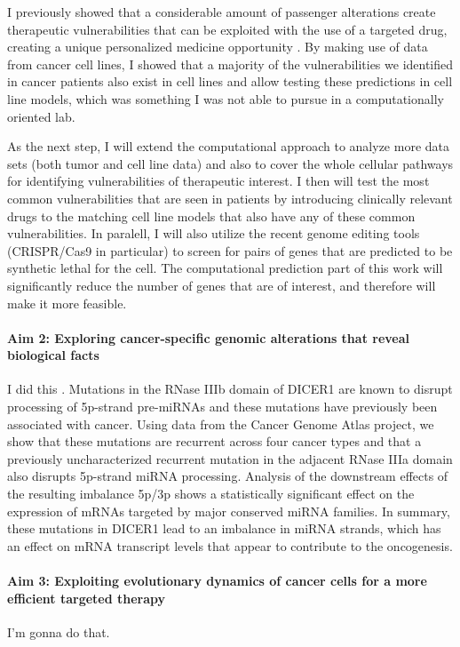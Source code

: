 \documentclass[11pt,letterpaper]{article}
\begin{document}
I previously showed that a considerable amount of passenger alterations create therapeutic vulnerabilities that can be exploited with the use of a targeted drug, creating a unique personalized medicine opportunity \cite{aksoy2014prediction}.
By making use of data from cancer cell lines,
I showed that a majority of the vulnerabilities we identified in cancer patients also exist in cell lines
and allow testing these predictions in cell line models, which was something I was not able to pursue in a computationally oriented lab.

As the next step, I will extend the computational approach to analyze more data sets (both tumor and cell line data) and also to cover the whole cellular pathways for identifying vulnerabilities of therapeutic interest.
I then will test the most common vulnerabilities that are seen in patients by introducing clinically relevant drugs to the matching cell line models that also have any of these common vulnerabilities.
In paralell, I will also utilize the recent genome editing tools (CRISPR/Cas9 in particular)
to screen for pairs of genes that are predicted to be synthetic lethal for the cell.
The computational prediction part of this work will significantly reduce the number of genes that are of interest,
and therefore will make it more feasible.


\paragraph{Aim 2: Exploring cancer-specific genomic alterations that reveal biological facts}
I did this \cite{aksoy2014cancer}.
Mutations in the RNase IIIb domain of DICER1 are known to disrupt processing of 5p-strand pre-miRNAs and these mutations have previously been associated with cancer. 
Using data from the Cancer Genome Atlas project, we show that these mutations are recurrent across four cancer types and that a previously uncharacterized recurrent mutation in the adjacent RNase IIIa domain also disrupts 5p-strand miRNA processing. 
Analysis of the downstream effects of the resulting imbalance 5p/3p shows a statistically significant effect on the expression of mRNAs targeted by major conserved miRNA families. 
In summary, these mutations in DICER1 lead to an imbalance in miRNA strands, which has an effect on mRNA transcript levels that appear to contribute to the oncogenesis.

\paragraph{Aim 3: Exploiting evolutionary dynamics of cancer cells for a more efficient targeted therapy}
I'm gonna do that.

\clearpage

\footnotesize{
{}
}
\end{document}
